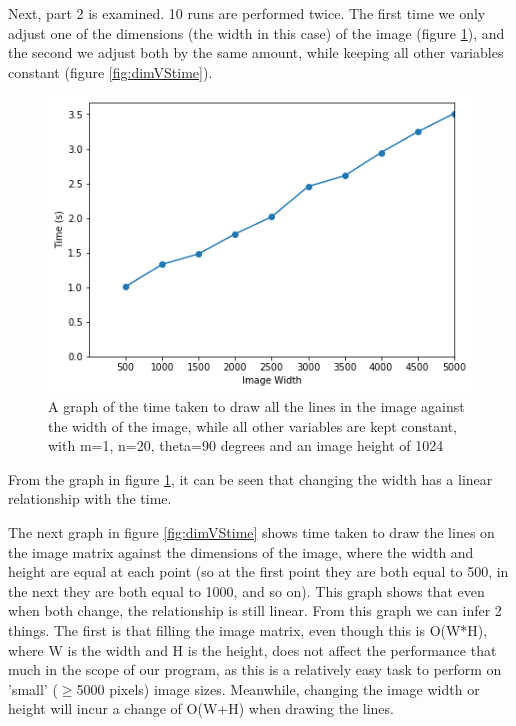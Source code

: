 Next, part 2 is examined. 10 runs are performed twice. The first time we only adjust one of the dimensions (the width in this case) of the image (figure \ref{fig:widthVStime}), and the second we adjust both by the same amount, while keeping all other variables constant (figure \ref{fig:dimVStime}).

\begin{figure}
	\includegraphics[width=\linewidth]{Images/widthVStime.png}
	\centering
	\caption{A graph of the time taken to draw all the lines in the image against the width of the image, while all other variables are kept constant, with m=1, n=20, theta=90 degrees and an image height of 1024}
	\label{fig:widthVStime}
\end{figure}

From the graph in figure \ref{fig:widthVStime}, it can be seen that changing the width has a linear relationship with the time.

The next graph in figure \ref{fig:dimVStime} shows time taken to draw the lines on the image matrix against the dimensions of the image, where the width and height are equal at each point (so at the first point they are both equal to 500, in the next they are both equal to 1000, and so on). This graph shows that even when both change, the relationship is still linear. From this graph we can infer 2 things. The first is that filling the image matrix, even though this is O(W*H), where W is the width and H is the height, does not affect the performance that much in the scope of our program, as this is a relatively easy task to perform on 'small' ($\ge$5000 pixels) image sizes. Meanwhile, changing the image width or height will incur a change of O(W+H) when drawing the lines.

